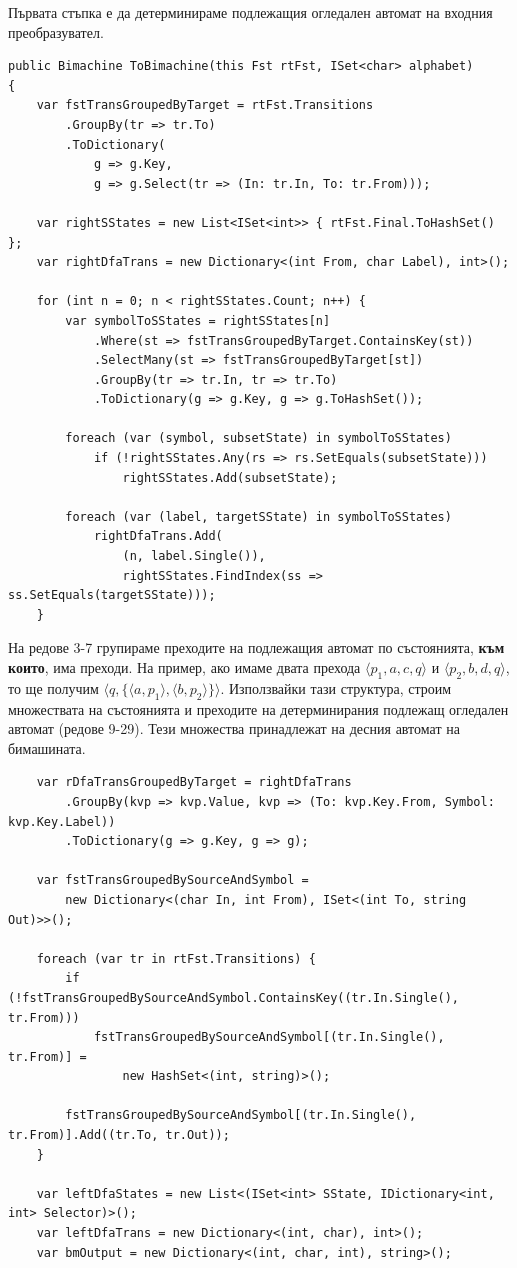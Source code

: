 \documentclass[12pt, oneside]{article}
\theoremstyle{definition}
\begin{document}
Първата стъпка е да детерминираме подлежащия огледален автомат на входния преобразувател.

\begin{verbatim}
public Bimachine ToBimachine(this Fst rtFst, ISet<char> alphabet)
{
    var fstTransGroupedByTarget = rtFst.Transitions
        .GroupBy(tr => tr.To)
        .ToDictionary(
            g => g.Key, 
            g => g.Select(tr => (In: tr.In, To: tr.From)));

    var rightSStates = new List<ISet<int>> { rtFst.Final.ToHashSet() };
    var rightDfaTrans = new Dictionary<(int From, char Label), int>();

    for (int n = 0; n < rightSStates.Count; n++) {
        var symbolToSStates = rightSStates[n]
            .Where(st => fstTransGroupedByTarget.ContainsKey(st))
            .SelectMany(st => fstTransGroupedByTarget[st])
            .GroupBy(tr => tr.In, tr => tr.To)
            .ToDictionary(g => g.Key, g => g.ToHashSet());

        foreach (var (symbol, subsetState) in symbolToSStates)
            if (!rightSStates.Any(rs => rs.SetEquals(subsetState)))
                rightSStates.Add(subsetState);
        
        foreach (var (label, targetSState) in symbolToSStates)
            rightDfaTrans.Add(
                (n, label.Single()),
                rightSStates.FindIndex(ss => ss.SetEquals(targetSState)));
	}
\end{verbatim}

На редове 3-7 групираме преходите на подлежащия автомат по състоянията, \textbf{към които}, има преходи. На пример, ако имаме двата прехода \( \langle p_1, a, c, q \rangle \) и \( \langle p_2, b, d, q \rangle \), то ще получим \( \langle q, \{ \langle a, p_1 \rangle, \langle b, p_2 \rangle \} \rangle \). Използвайки тази структура, строим множествата на състоянията и преходите на детерминирания подлежащ огледален автомат (редове 9-29). Тези множества принадлежат на десния автомат на бимашината.

\begin{verbatim}
    var rDfaTransGroupedByTarget = rightDfaTrans
        .GroupBy(kvp => kvp.Value, kvp => (To: kvp.Key.From, Symbol: kvp.Key.Label))
        .ToDictionary(g => g.Key, g => g);

	var fstTransGroupedBySourceAndSymbol = 
		new Dictionary<(char In, int From), ISet<(int To, string Out)>>();

    foreach (var tr in rtFst.Transitions) {
        if (!fstTransGroupedBySourceAndSymbol.ContainsKey((tr.In.Single(), tr.From)))
			fstTransGroupedBySourceAndSymbol[(tr.In.Single(), tr.From)] = 
				new HashSet<(int, string)>();

        fstTransGroupedBySourceAndSymbol[(tr.In.Single(), tr.From)].Add((tr.To, tr.Out));
    }

    var leftDfaStates = new List<(ISet<int> SState, IDictionary<int, int> Selector)>();
    var leftDfaTrans = new Dictionary<(int, char), int>();
    var bmOutput = new Dictionary<(int, char, int), string>();
\end{verbatim}
\end{document}
